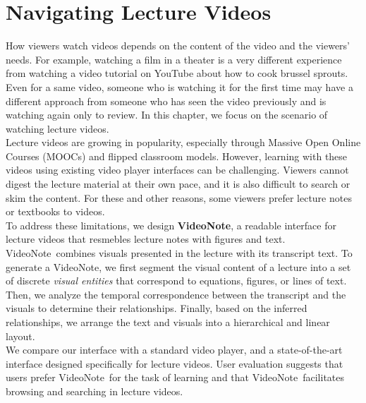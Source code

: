\newcommand{\systemname}[0]{VideoNote}


\chapter{Navigating Lecture Videos} %
\label{ch:visualtranscript} %

How viewers watch videos depends on the content of the video and the viewers'
needs. For example, watching a film in a theater is a very different experience
from watching a video tutorial on YouTube about how to cook brussel sprouts.
Even for a same video, someone who is watching it for the first time may have a
different approach from someone who has seen the video previously and is
watching again only to review. In this chapter, we focus on the scenario of
watching lecture videos. \\

Lecture videos are growing in popularity, especially through Massive Open Online Courses
(MOOCs) and flipped classroom models.
However, learning with these videos using existing video player interfaces can
be challenging. Viewers cannot digest the lecture material at their
own pace, and it is also difficult to search or skim the content. For these and other
reasons, some viewers prefer lecture notes or textbooks to videos.\\

To address these limitations, we design \textbf{\systemname}, a readable
interface for lecture videos that resmebles lecture notes with figures and text.
\systemname\ combines visuals presented in the lecture
with its transcript text. To generate a \systemname, we first segment the visual content
of a lecture into a set of discrete \emph{visual entities} that correspond to equations, figures, or lines of text. Then, we analyze
the temporal correspondence between the transcript and the visuals to determine their relationships. Finally, based on the inferred relationships, we arrange the text and visuals into a hierarchical and linear layout. \\

We compare our interface with a standard video player, and a state-of-the-art interface designed specifically for 
lecture videos. User evaluation suggests that users prefer \systemname\ for the task of learning and that \systemname\
facilitates browsing and searching in lecture videos.

